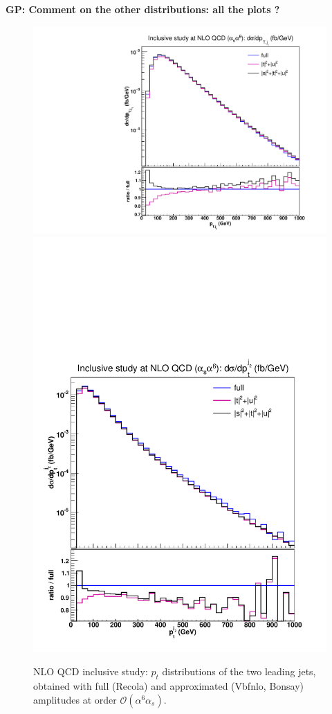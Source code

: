 {\bf GP: Comment on the other distributions: all the plots ?}
\begin{figure}[hbt]
\centering
{\includegraphics[scale=0.35]{figures/scanfigures/ptj1_nlo.pdf}}
{\includegraphics[scale=0.35]{figures/scanfigures/ptj2_nlo.pdf}}
\caption{NLO QCD inclusive study: $p_t$ distributions of the two leading jets, obtained with full ({\sc Recola}) and approximated ({\sc Vbfnlo, Bonsay}) amplitudes at order $\mathcal{O}(\alpha^6\alpha_s)$.} \label{fig:mjjdyjj_1d_2}
\end{figure}


